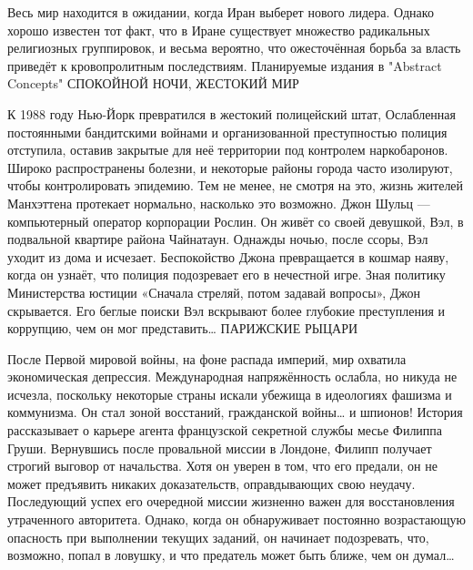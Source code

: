 \documentclass[a4paper,12pt]{book}
\begin{document}
\par
Весь мир находится в ожидании, когда Иран выберет нового лидера. Однако хорошо известен тот факт, что в Иране существует множество радикальных религиозных группировок, и весьма вероятно, что ожесточённая борьба за власть приведёт к кровопролитным последствиям.
\newpage
{}
\noindent
Планируемые издания в "Abstract Concepts"
\newline
\newline
\newline
\newline
СПОКОЙНОЙ НОЧИ, ЖЕСТОКИЙ МИР\\
\par
К 1988 году Нью-Йорк превратился в жестокий полицейский штат, Ослабленная постоянными бандитскими войнами и организованной преступностью полиция отступила, оставив закрытые для неё территории под контролем наркобаронов. Широко распространены болезни, и некоторые районы города часто изолируют, чтобы контролировать эпидемию. Тем не менее, не смотря на это, жизнь жителей Манхэттена протекает нормально, насколько это возможно.
Джон Шульц — компьютерный оператор корпорации Рослин. Он живёт со своей девушкой, Вэл, в подвальной квартире района Чайнатаун.
Однажды ночью, после ссоры, Вэл уходит из дома и исчезает. Беспокойство Джона превращается в кошмар наяву, когда он узнаёт, что полиция подозревает его в нечестной игре. Зная политику Министерства юстиции «Сначала стреляй, потом задавай вопросы», Джон скрывается.
Его беглые поиски Вэл вскрывают более глубокие преступления и коррупцию, чем он мог представить…
\newline
\newline
\newline
ПАРИЖСКИЕ РЫЦАРИ\\
\par
После Первой мировой войны, на фоне распада империй, мир охватила экономическая депрессия. Международная напряжённость ослабла, но никуда не исчезла, поскольку некоторые страны искали убежища в идеологиях фашизма и коммунизма.
Он стал зоной восстаний, гражданской войны… и шпионов!
История рассказывает о карьере агента французской секретной службы месье Филиппа Груши. Вернувшись после провальной миссии в Лондоне, Филипп получает строгий выговор от начальства. Хотя он уверен в том, что его предали, он не может предъявить никаких доказательств, оправдывающих свою неудачу. Последующий успех его очередной миссии жизненно важен для восстановления утраченного авторитета. Однако, когда он обнаруживает постоянно возрастающую опасность при выполнении текущих заданий, он начинает подозревать, что, возможно, попал в ловушку, и что предатель может быть ближе, чем он думал…
\end{document}
